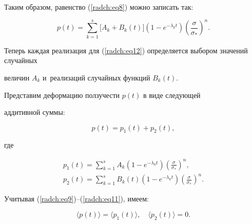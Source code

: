 Таким образом, равенство (\ref{radch:eq8}) можно записать так:

\begin{equation}

\label{radch:eq12}

p\left( t \right) = \sum\limits_{k = 1}^s {\Big[ {A_k + B_k \left( t 

\right)} \Big]\left( {1 - e^{ - \lambda _k t}} \right)\left( {\frac{\sigma 

}{\sigma _ * }} \right)^n} .

\end{equation}





Теперь каждая реализация для (\ref{radch:eq12}) определяется выбором значений случайных 

величин $A_k $ и~реализаций случайных функций $B_k \left( t \right)$.



Представим деформацию ползучести $p\left( t \right)$ в виде следующей 

аддитивной суммы:

\begin{equation}

\label{radch:eq13}

p\left( t \right) = p_1 \left( t \right) + p_2 \left( t \right),

\end{equation}

где

\begin{gather}

\label{radch:eq14}

p_1 \left( t \right) = \sum\limits_{k = 1}^s {A_k \left( {1 - e^{ - \lambda 

_k t}} \right)\left( {\frac{\sigma }{\sigma _ * }} \right)^n} ,\\

\label{radch:eq15}

p_2 \left( t \right) = \sum\limits_{k = 1}^s {B_k \left( t \right)\left( {1 

- e^{ - \lambda _k t}} \right)\left( {\frac{\sigma }{\sigma _ * }} 

\right)^n} .

\end{gather}



Учитывая (\ref{radch:eq9})--(\ref{radch:eq11}), имеем:

\begin{equation}

\label{radch:eq16}

 \langle p\left( t \right) \rangle = \langle p_1 \left( t \right) \rangle ,

\quad

 \langle p_2 \left( t \right) \rangle = 0.

\end{equation}





